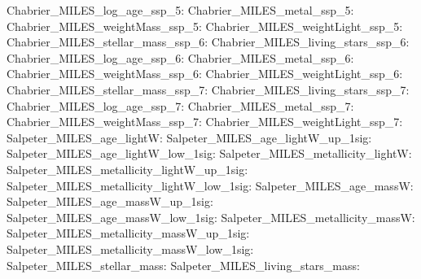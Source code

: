 Chabrier\_MILES\_log\_age\_ssp\_5:  \newline 
Chabrier\_MILES\_metal\_ssp\_5:  \newline 
Chabrier\_MILES\_weightMass\_ssp\_5:  \newline 
Chabrier\_MILES\_weightLight\_ssp\_5:  \newline 
Chabrier\_MILES\_stellar\_mass\_ssp\_6:  \newline 
Chabrier\_MILES\_living\_stars\_ssp\_6:  \newline 
Chabrier\_MILES\_log\_age\_ssp\_6:  \newline 
Chabrier\_MILES\_metal\_ssp\_6:  \newline 
Chabrier\_MILES\_weightMass\_ssp\_6:  \newline 
Chabrier\_MILES\_weightLight\_ssp\_6:  \newline 
Chabrier\_MILES\_stellar\_mass\_ssp\_7:  \newline 
Chabrier\_MILES\_living\_stars\_ssp\_7:  \newline 
Chabrier\_MILES\_log\_age\_ssp\_7:  \newline 
Chabrier\_MILES\_metal\_ssp\_7:  \newline 
Chabrier\_MILES\_weightMass\_ssp\_7:  \newline 
Chabrier\_MILES\_weightLight\_ssp\_7:  \newline 
Salpeter\_MILES\_age\_lightW:  \newline 
Salpeter\_MILES\_age\_lightW\_up\_1sig:  \newline 
Salpeter\_MILES\_age\_lightW\_low\_1sig:  \newline 
Salpeter\_MILES\_metallicity\_lightW:  \newline 
Salpeter\_MILES\_metallicity\_lightW\_up\_1sig:  \newline 
Salpeter\_MILES\_metallicity\_lightW\_low\_1sig:  \newline 
Salpeter\_MILES\_age\_massW:  \newline 
Salpeter\_MILES\_age\_massW\_up\_1sig:  \newline 
Salpeter\_MILES\_age\_massW\_low\_1sig:  \newline 
Salpeter\_MILES\_metallicity\_massW:  \newline 
Salpeter\_MILES\_metallicity\_massW\_up\_1sig:  \newline 
Salpeter\_MILES\_metallicity\_massW\_low\_1sig:  \newline 
Salpeter\_MILES\_stellar\_mass:  \newline 
Salpeter\_MILES\_living\_stars\_mass:  \newline 
